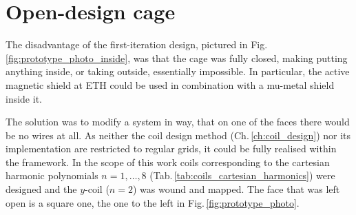 \section{Open-design cage}
The disadvantage of the first-iteration design, pictured in Fig.\,\ref{fig:prototype_photo_inside}, was that the cage was fully closed, making putting anything inside, or taking outside, essentially impossible. In particular, the active magnetic shield at ETH could be used in combination with a mu-metal shield inside it.




The solution was to modify a system in way, that on one of the faces there would be no wires at all. As neither the coil design method (Ch.\,\ref{ch:coil_design}) nor its implementation are restricted to regular grids, it could be fully realised within the framework. In the scope of this work coils corresponding to the cartesian harmonic polynomials $n = 1, \ldots, 8$ (Tab.\,\ref{tab:coils_cartesian_harmonics}) were designed and the $y$-coil ($n = 2$) was wound and mapped. The face that was left open is a square one, the one to the left in Fig.\,\ref{fig:prototype_photo}.


